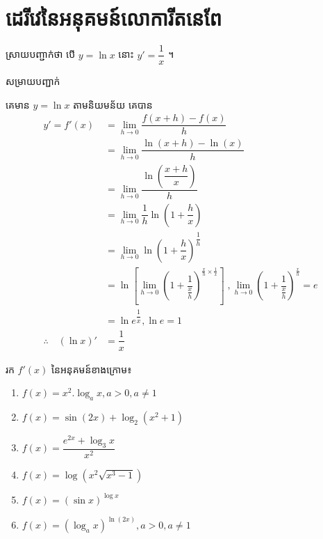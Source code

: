 \documentclass[12pt,fleqn]{book} %
\newcommand{\solution}{{\begin{center}\kml \color{magenta} សម្រាយបញ្ជាក់\end{center} }}
\begin{document}
\section{ដេរីវេនៃអនុគមន៍លោការីតនេពែ}
ស្រាយបញ្ជាក់ថា បើ $y=\ln x$ នោះ $y'=\dfrac{1}{x}$ ។
\solution 
គេមាន $y=\ln x$ តាមនិយមន័យ គេបាន
\begin{align*}
y'=f'(x)&=\lim_{h\to 0}\dfrac{f(x+h)-f(x)}{h}\\
&=\lim_{h\to 0}\dfrac{\ln (x+h)-\ln (x)}{h}\\
&=\lim_{h\to 0}\dfrac{\ln \left(\dfrac{x+h}{x} \right)}{h}\\
&=\lim_{h\to 0}\dfrac{1}{h}\ln \left(1+\dfrac{h}{x} \right)\\
&=\lim_{h\to 0}\ln \left(1+\dfrac{h}{x}\right)^{\dfrac{1}{h}}\\
&=\ln \left[\lim_{h\to 0}\left(1+\dfrac{1}{\frac{x}{h}} \right)^{\frac{x}{h}\times \frac{1}{x}}  \right]\;, \lim_{h\to 0}\left(1+\dfrac{1}{\frac{x}{h}} \right)^{\frac{x}{h}}=e\\
&=\ln e^{\dfrac{1}{x}},\ln e=1\\
\therefore \quad (\ln x)'&=\dfrac{1}{x} 
\end{align*}
\begin{example}
រក $f'(x)$ នៃអនុគមន៍ខាងក្រោម៖
\begin{multicols}{2}
\begin{enumerate}
\item $f(x)=x^2.\log_a x, a>0,a\neq 1$
\item $f(x)=\sin (2x)+\log_2 (x^2+1)$
\item $f(x)=\dfrac{e^{2x}+\log_3 x}{x^2}$
\item $f(x)=\log (x^2 \sqrt{x^3-1})$
\item $f(x)=(\sin x)^{\log x}$
\item $f(x)=(\log _a x)^{\ln (2x)},a>0,a\neq 1$
\end{enumerate}
\end{multicols}
\end{example}
\end{document}

